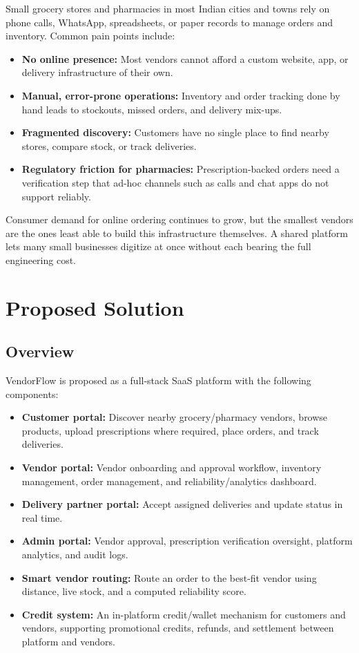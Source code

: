 \documentclass[11pt,a4paper]{article}
\begin{document}
Small grocery stores and pharmacies in most Indian cities and towns rely on phone calls,
WhatsApp, spreadsheets, or paper records to manage orders and inventory. Common pain points
include:

\begin{itemize}[leftmargin=1.5em]
    \item \textbf{No online presence:} Most vendors cannot afford a custom website, app, or
    delivery infrastructure of their own.
    \item \textbf{Manual, error-prone operations:} Inventory and order tracking done by hand
    leads to stockouts, missed orders, and delivery mix-ups.
    \item \textbf{Fragmented discovery:} Customers have no single place to find nearby stores,
    compare stock, or track deliveries.
    \item \textbf{Regulatory friction for pharmacies:} Prescription-backed orders need a
    verification step that ad-hoc channels such as calls and chat apps do not support reliably.
\end{itemize}

Consumer demand for online ordering continues to grow, but the smallest vendors are the
ones least able to build this infrastructure themselves. A shared platform lets many small
businesses digitize at once without each bearing the full engineering cost.

\section{Proposed Solution}

\subsection{Overview}

VendorFlow is proposed as a full-stack SaaS platform with the following components:

\begin{itemize}[leftmargin=1.5em]
    \item \textbf{Customer portal:} Discover nearby grocery/pharmacy vendors, browse products,
    upload prescriptions where required, place orders, and track deliveries.
    \item \textbf{Vendor portal:} Vendor onboarding and approval workflow, inventory management,
    order management, and reliability/analytics dashboard.
    \item \textbf{Delivery partner portal:} Accept assigned deliveries and update status in real time.
    \item \textbf{Admin portal:} Vendor approval, prescription verification oversight, platform
    analytics, and audit logs.
    \item \textbf{Smart vendor routing:} Route an order to the best-fit vendor using distance,
    live stock, and a computed reliability score.
    \item \textbf{Credit system:} An in-platform credit/wallet mechanism for customers and vendors,
    supporting promotional credits, refunds, and settlement between platform and vendors.
\end{itemize}
\end{document}

